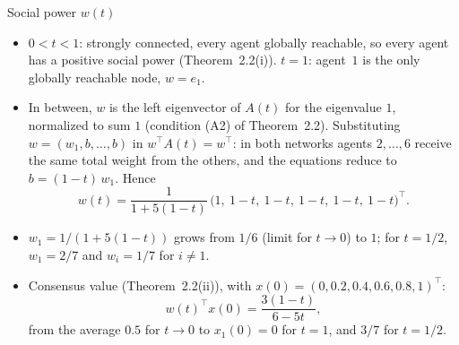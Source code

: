 \begin{frame}[label=bk-socialpower]{Social power $w(t)$}
  \small
  \begin{itemize}
    \item $0 < t < 1$: strongly connected, every agent globally reachable, so every agent
          has a positive social power (Theorem~2.2(i)). $t = 1$: agent~$1$ is the only
          globally reachable node, $w = e_1$.
    \item In between, $w$ is the left eigenvector of $A(t)$ for the eigenvalue $1$,
          normalized to sum $1$ (condition (A2) of Theorem~2.2). Substituting
          $w = (w_1, b, \dots, b)$ in $w^\top A(t) = w^\top$: in both networks agents
          $2, \dots, 6$ receive the same total weight from the others, and the equations
          reduce to $b = (1-t)\, w_1$. Hence
          \[ w(t) = \frac{1}{1 + 5(1-t)}\,\big(1,\ 1-t,\ 1-t,\ 1-t,\ 1-t,\ 1-t\big)^\top . \]
    \item $w_1 = 1/(1 + 5(1-t))$ grows from $1/6$ (limit for $t \to 0$) to $1$; for $t = 1/2$, $w_1 = 2/7$ and
          $w_i = 1/7$ for $i \neq 1$.
    \item Consensus value (Theorem~2.2(ii)), with $x(0) = (0, 0.2, 0.4, 0.6, 0.8, 1)^\top$:
          \[ w(t)^\top x(0) = \frac{3(1-t)}{6 - 5t}, \]
          from the average $0.5$ for $t \to 0$ to $x_1(0) = 0$ for $t = 1$, and $3/7$ for
          $t = 1/2$.
  \end{itemize}
\end{frame}


